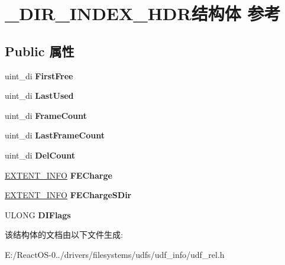 \hypertarget{struct___d_i_r___i_n_d_e_x___h_d_r}{}\section{\+\_\+\+D\+I\+R\+\_\+\+I\+N\+D\+E\+X\+\_\+\+H\+D\+R结构体 参考}
\label{struct___d_i_r___i_n_d_e_x___h_d_r}
\subsection*{Public 属性}
\begin{DoxyCompactItemize}
\item 
\mbox{\label{struct___d_i_r___i_n_d_e_x___h_d_r_a029fb6b77090325bb70a779ddc9f54a1}} 
uint\+\_\+di {\bfseries First\+Free}
\item 
\mbox{\label{struct___d_i_r___i_n_d_e_x___h_d_r_a39459508fb890209fa27eb0408c26905}} 
uint\+\_\+di {\bfseries Last\+Used}
\item 
\mbox{\label{struct___d_i_r___i_n_d_e_x___h_d_r_a507d2bb1d7313ddf19578e4b135145f9}} 
uint\+\_\+di {\bfseries Frame\+Count}
\item 
\mbox{\label{struct___d_i_r___i_n_d_e_x___h_d_r_a55f48ecd8c2276c66a474b9ef2c49b1c}} 
uint\+\_\+di {\bfseries Last\+Frame\+Count}
\item 
\mbox{\label{struct___d_i_r___i_n_d_e_x___h_d_r_a8d11b0f1fdebbc8322d739c709315e1b}} 
uint\+\_\+di {\bfseries Del\+Count}
\item 
\mbox{\label{struct___d_i_r___i_n_d_e_x___h_d_r_a057209cafec583590ca78e59faa9f949}} 
\hyperlink{struct___e_x_t_e_n_t___i_n_f_o}{E\+X\+T\+E\+N\+T\+\_\+\+I\+N\+FO} {\bfseries F\+E\+Charge}
\item 
\mbox{\label{struct___d_i_r___i_n_d_e_x___h_d_r_a183d426907792e0da7378cfcfdeffc34}} 
\hyperlink{struct___e_x_t_e_n_t___i_n_f_o}{E\+X\+T\+E\+N\+T\+\_\+\+I\+N\+FO} {\bfseries F\+E\+Charge\+S\+Dir}
\item 
\mbox{\label{struct___d_i_r___i_n_d_e_x___h_d_r_a6c5dd0eef7a9013d77a3904fd511a64d}} 
U\+L\+O\+NG {\bfseries D\+I\+Flags}
\end{DoxyCompactItemize}


该结构体的文档由以下文件生成\+:\begin{DoxyCompactItemize}
\item 
E\+:/\+React\+O\+S-\/0../drivers/filesystems/udfs/udf\+\_\+info/udf\+\_\+rel.\+h\end{DoxyCompactItemize}
